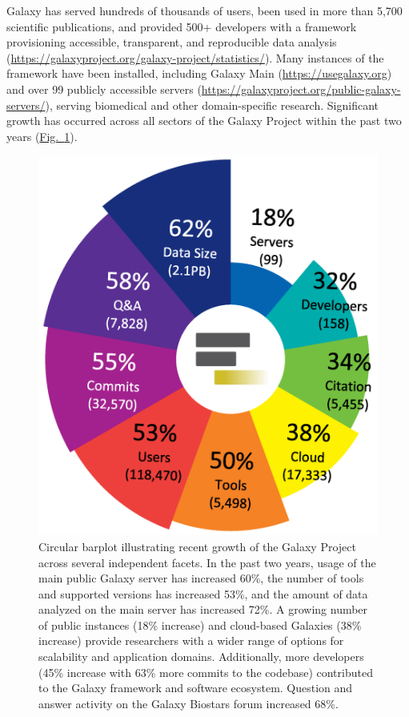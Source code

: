 Galaxy has served hundreds of thousands of users, been used in more than 5,700 scientific publications, and provided 500+ developers with a framework provisioning accessible, transparent, and reproducible data analysis (\url{https://galaxyproject.org/galaxy-project/statistics/}). Many instances of the framework have been installed, including Galaxy Main (\url{https://usegalaxy.org}) and over 99 publicly accessible servers (\url{https://galaxyproject.org/public-galaxy-servers/}), serving biomedical and other domain-specific research. Significant growth has occurred across all sectors of the Galaxy Project within the past two years (\hyperref[fig:growth]{Fig.~\ref{fig:growth}}).


\begin{figure}[ht!]
\centering
\includegraphics[]{chapters/images/galaxy/galaxy-growth.png}
\caption{Circular barplot illustrating recent growth of the Galaxy Project across several independent facets. In the past two years, usage of the main public Galaxy server has increased 60\%, the number of tools and supported versions has increased 53\%, and the amount of data analyzed on the main server has increased 72\%. A growing number of public instances (18\% increase) and cloud-based Galaxies (38\% increase) provide researchers with a wider range of options for scalability and application domains. Additionally, more developers (45\% increase with 63\% more commits to the codebase) contributed to the Galaxy framework and software ecosystem. Question and answer activity on the Galaxy Biostars forum increased 68\%.}
\label{fig:growth}
\end{figure}

